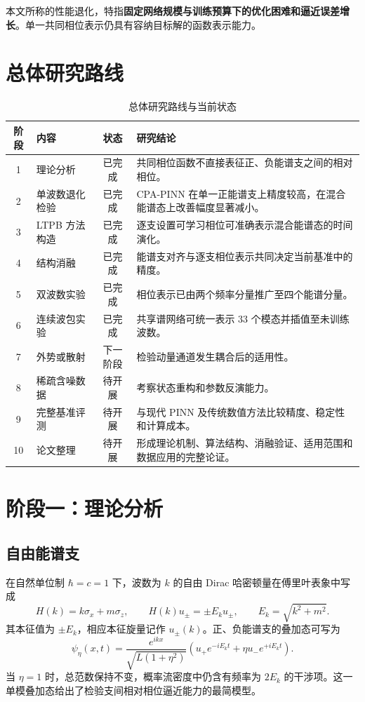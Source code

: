 \documentclass[UTF8,a4paper,12pt,fontset=fandol]{ctexart}
\begin{document}
本文所称的性能退化，特指\textbf{固定网络规模与训练预算下的优化困难和逼近误差增长}。单一共同相位表示仍具有容纳目标解的函数表示能力。

\section{总体研究路线}

\begin{table}[htbp]
\centering
\small
\caption{总体研究路线与当前状态}
\begin{tabularx}{\textwidth}{@{}c l c Y@{}}
\toprule
阶段 & 内容 & 状态 & 研究结论 \\
 & 理论分析 & 已完成 & 共同相位函数不直接表征正、负能谱支之间的相对相位。 \\
2 & 单波数退化检验 & 已完成 & CPA-PINN 在单一正能谱支上精度较高，在混合能谱态上改善幅度显著减小。 \\
3 & LTPB 方法构造 & 已完成 & 逐支设置可学习相位可准确表示混合能谱态的时间演化。 \\
4 & 结构消融 & 已完成 & 能谱支对齐与逐支相位表示共同决定当前基准中的精度。 \\
5 & 双波数实验 & 已完成 & 相位表示已由两个频率分量推广至四个能谱分量。 \\
6 & 连续波包实验 & 已完成 & 共享谱网络可统一表示 33 个模态并插值至未训练波数。 \\
7 & 外势或散射 & 下一阶段 & 检验动量通道发生耦合后的适用性。 \\
8 & 稀疏含噪数据 & 待开展 & 考察状态重构和参数反演能力。 \\
9 & 完整基准评测 & 待开展 & 与现代 PINN 及传统数值方法比较精度、稳定性和计算成本。 \\
10 & 论文整理 & 待开展 & 形成理论机制、算法结构、消融验证、适用范围和数据应用的完整论证。 \\
\bottomrule
\end{tabularx}
\end{table}

\section{阶段一：理论分析}

\subsection{自由能谱支}

在自然单位制 $\hbar=c=1$ 下，波数为 $k$ 的自由 Dirac 哈密顿量在傅里叶表象中写成
\begin{equation}
H(k)=k\sigma_x+m\sigma_z,
\qquad
H(k)u_\pm=\pm E_k u_\pm,
\qquad
E_k=\sqrt{k^2+m^2}.
\end{equation}
其本征值为 $\pm E_k$，相应本征旋量记作 $u_\pm(k)$。正、负能谱支的叠加态可写为
\begin{equation}
\psi_\eta(x,t)=
\frac{e^{ikx}}{\sqrt{L(1+\eta^2)}}
\left(u_+e^{-iE_kt}+\eta u_-e^{+iE_kt}\right).
\end{equation}
当 $\eta=1$ 时，总范数保持不变，概率流密度中仍含有频率为 $2E_k$ 的干涉项。这一单模叠加态给出了检验支间相对相位逼近能力的最简模型。
\end{document}
